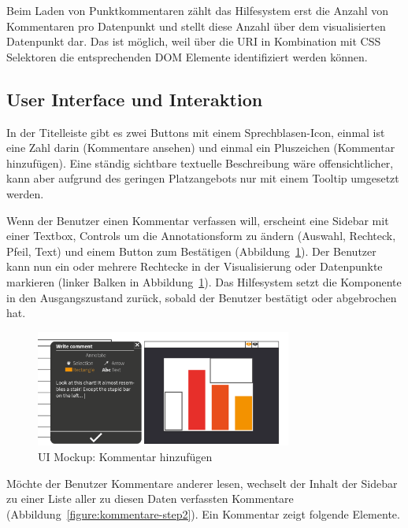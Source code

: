 \documentclass[
	headsepline,
	footsepline,
	fontsize=12pt,
	bibliography=totoc
]{scrbook}
\begin{document}
Beim Laden von Punktkommentaren zählt das Hilfesystem erst die Anzahl von Kommentaren pro Datenpunkt und stellt diese Anzahl über dem visualisierten Datenpunkt dar. Das ist möglich, weil über die URI in Kombination mit CSS Selektoren die entsprechenden DOM Elemente identifiziert werden können.


\subsection{User Interface und Interaktion}
\label{section:konzeption:kommentare:ui}


In der Titelleiste gibt es zwei Buttons mit einem Sprechblasen-Icon, einmal ist eine Zahl darin (Kommentare ansehen) und einmal ein Pluszeichen (Kommentar hinzufügen). Eine ständig sichtbare textuelle Beschreibung wäre offensichtlicher, kann aber aufgrund des geringen Platzangebots nur mit einem Tooltip umgesetzt werden.

Wenn der Benutzer einen Kommentar verfassen will, erscheint eine Sidebar mit einer Textbox, Controls um die Annotationsform zu ändern (Auswahl, Rechteck, Pfeil, Text) und einem Button zum Bestätigen (Abbildung~\ref{figure:kommentare-step4}). Der Benutzer kann nun ein oder mehrere Rechtecke in der Visualisierung oder Datenpunkte markieren (linker Balken in Abbildung~\ref{figure:kommentare-step4}). Das Hilfesystem setzt die Komponente in den Ausgangszustand zurück, sobald der Benutzer bestätigt oder abgebrochen hat.

\begin{figure}[htbp]
   \centering
   \includegraphics[width=0.75\textwidth]{images/konzeption-kommentare-step4.png}
   \caption{UI Mockup: Kommentar hinzufügen}
   \label{figure:kommentare-step4}
\end{figure}

Möchte der Benutzer Kommentare anderer lesen, wechselt der Inhalt der Sidebar zu einer Liste aller zu diesen Daten verfassten Kommentare (Abbildung~\ref{figure:kommentare-step2}). Ein Kommentar zeigt folgende Elemente.
\end{document}
